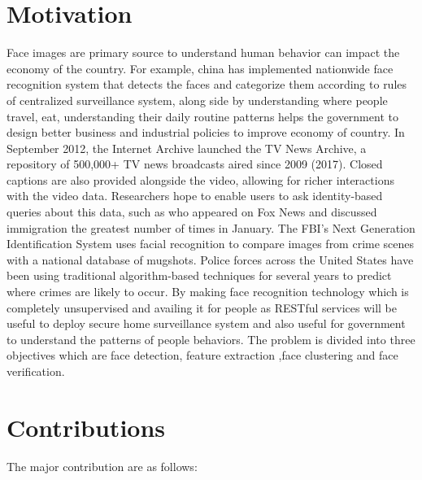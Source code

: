 \documentclass[a4paper,12pt, twoside]{NITKReport}
\begin{document}
	\section{Motivation}
	\label{moti}
	Face images are primary source to understand human behavior can impact the economy of the country. For example, \cite{3} china has implemented nationwide face recognition system that detects the faces and categorize them according to rules of centralized surveillance system, along side by understanding where people travel, eat, understanding their daily routine patterns helps the government to design better business and industrial policies to improve economy of country. 
In September 2012, the Internet Archive launched the TV News Archive, a repository of 500,000+ TV news broadcasts aired since 2009 (2017). Closed captions are also provided alongside the video, allowing for richer interactions with the video data. Researchers hope to enable users to ask identity-based queries about this data, such as who appeared on Fox News and discussed immigration the greatest number of times in January. The FBI’s Next Generation Identification System uses facial recognition to compare images from crime scenes with a national database of mugshots. Police forces across the United States have been using traditional algorithm-based techniques for several years to predict where crimes are likely to occur. By making face recognition technology which is completely unsupervised and availing it for people as RESTful services will be useful to deploy secure home surveillance system and also useful for government to understand the patterns of people behaviors. The problem is divided into three objectives which are face detection, feature extraction ,face clustering and face verification.

	
\section{Contributions}
\label{contri}
 The major contribution are as follows:
  
\end{document}
